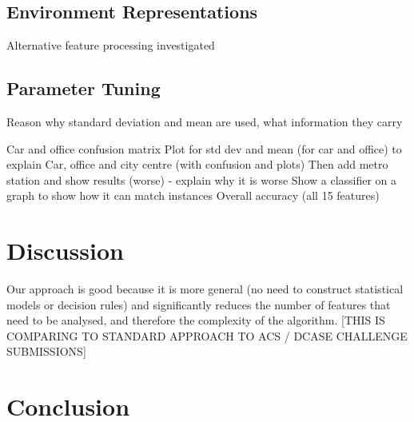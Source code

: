\documentclass[11pt]{article}
\begin{document}
\begin{multicols}{2}
\subsection{Environment Representations}

Alternative feature processing investigated



\subsection{Parameter Tuning}

%
%
%



Reason why standard deviation and mean are used, what information they carry


Car and office confusion matrix
Plot for std dev and mean (for car and office) to explain
Car, office and city centre (with confusion and plots)
Then add metro station and show results (worse) - explain why it is worse
Show a classifier on a graph to show how it can match instances
Overall accuracy (all 15 features)


\section{Discussion}


Our approach is good because it is more general (no need to construct statistical models or decision rules) and significantly reduces the number of features that need to be analysed, and therefore the complexity of the algorithm. [THIS IS COMPARING TO STANDARD APPROACH TO ACS / DCASE CHALLENGE SUBMISSIONS]






\section{Conclusion}











\end{multicols}
\end{document}
